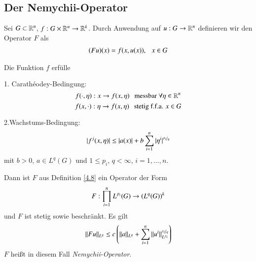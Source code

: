 \subsection{Der Nemychii-Operator}

\begin{defi}\label{4.8}
    Sei $G\subset \mathbb{R}^n$, $f:G\times \mathbb{R}^n\rightarrow \mathbb{R}^k$. Durch Anwendung auf $u:G\rightarrow \mathbb{R}^n$ definieren
    wir den Operator $F$ als
    \begin{align}
        (Fu)(x)=f(x,u(x)), \hspace{.25cm} x\in G
    \end{align}
\end{defi}

\begin{lem}\label{4.9}
    Die Funktion $f$ erfülle
    \begin{description}
        \item{1. Carathéodey-Bedingung:}
        \[
            f(\cdot,\eta): x \rightarrow f(x,\eta) \hspace{.25cm} \text{messbar } \forall \eta\in \mathbb{R}^n
        \]
        \[
            f(x,\cdot):\eta\rightarrow f(x,\eta) \hspace{.25cm} \text{stetig f.f.a. } x\in G
        \]
        \item{2.Wachstums-Bedingung:}
        \[
            |f^j(x,\eta)|\leq |a(x)|+ b \sum_{i=1}^n|\eta^i|^{\nicefrac{p_i}{q}}
        \]
        mit $b>0$, $a\in L^q(G)$ und $1\leq p_i$, $q<\infty$, $i=1,…,n$. 
    \end{description}
    Dann ist $F$ aus Definition \ref{4.8} ein Operator der Form
    \[
        F:\prod_{i=1}^n L^{p_i}(G) \rightarrow (L^q(G))^k
    \]
    und $F$ ist stetig sowie beschränkt. Es gilt
    \[
        \|Fu\|_{L^q}\leq c\left( \|a\|_{L^q} + \sum_{i=1}^n \|u^i\|_{L^{p_i}}^{\nicefrac{p_i}{q}} \right)
    \]
    $F$ heißt in diesem Fall \textit{Nemychii-Operator}.
\end{lem}


